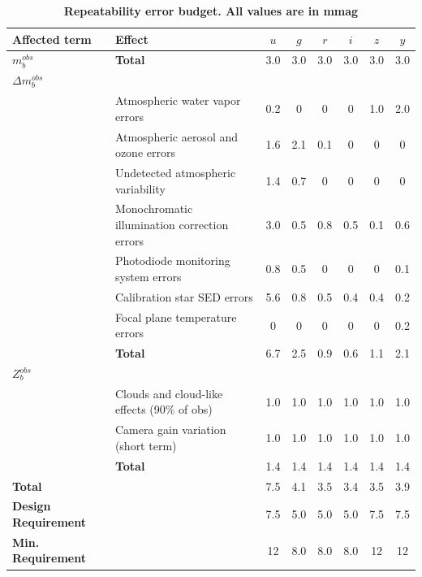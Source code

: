 \documentclass[12pt,preprint]{aastex}
\begin{document}
\begin{landscape}
\begin{center}
\begin{table}[htb]
\caption{{\bf Repeatability error budget.  All values are in mmag} }
\begin{tabular}{l | l | c c c c c c }
Affected term & Effect &  $u$  & $g$ & $r$ & $i$ & $z$ & $y$ \\ \hline
{\bf $m_b^{obs}$} & {\bf Total} & 3.0 & 3.0 & 3.0 & 3.0 & 3.0 & 3.0 \\ \hline
{\bf $\Delta m_b^{obs}$} & & & & \\
& Atmospheric water vapor errors & 0.2 & 0 & 0 & 0 & 1.0 & 2.0  \\
& Atmospheric aerosol and ozone errors & 1.6 & 2.1 & 0.1 & 0 & 0 & 0  \\
& Undetected atmospheric variability & 1.4 & 0.7 & 0 & 0 & 0 & 0 \\
& Monochromatic illumination correction errors & 3.0 & 0.5 & 0.8 & 0.5 & 0.1 & 0.6\\
& Photodiode monitoring system errors & 0.8 & 0.5 & 0 & 0 & 0 & 0.1 \\
& Calibration star SED errors & 5.6 & 0.8 & 0.5 & 0.4 & 0.4 & 0.2 \\
& Focal plane temperature errors & 0 & 0 & 0 & 0 & 0 & 0.2 \\ 
& {\bf Total} & 6.7 & 2.5 & 0.9 & 0.6 & 1.1 & 2.1 \\ \hline
$Z_b^{obs}$ & & & & \\
& Clouds and cloud-like effects (90\% of obs) & 1.0 & 1.0 & 1.0 & 1.0 & 1.0 & 1.0 \\
& Camera gain variation (short term) & 1.0 & 1.0 & 1.0 & 1.0 & 1.0 & 1.0 \\
& {\bf Total} & 1.4 & 1.4 & 1.4 & 1.4 & 1.4 & 1.4 \\ \hline
{\bf Total} & & 7.5 & 4.1 & 3.5 & 3.4 & 3.5 & 3.9 \\ \hline
{\bf Design Requirement} & & 7.5 & 5.0 & 5.0 & 5.0 & 7.5 & 7.5 \\ 
{\bf Min. Requirement} & & 12 & 8.0 & 8.0 & 8.0 & 12 & 12 \\
\end{tabular}
\label{tab:rpt_error_budget}
\end{table}
\end{center}
\end{landscape}
\end{document}
